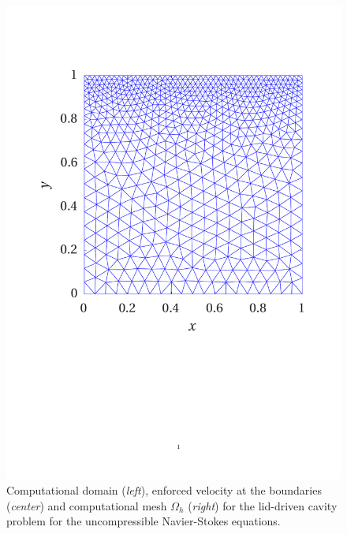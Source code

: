 \documentclass{elsarticle}
\numberwithin{equation}{section}
\theoremstyle{theorem}
\theoremstyle{definition}
\theoremstyle{remark}
\theoremstyle{proposition}
\numberwithin{figure}{section}
\begin{document}
\begin{figure}[t!]
\begin{minipage}{0.32\textwidth}
				\includegraphics[scale = 0.275, trim = {2cm 9cm 1.5cm 3.5cm}, clip]{dc_mesh}
			\end{minipage}
			
			\caption{Computational domain (\emph{left}), enforced velocity at the boundaries (\emph{center}) and computational mesh $\Omega_h$ (\emph{right}) for the lid-driven cavity problem for the uncompressible Navier-Stokes equations.}
			\label{fig:dc-domain}
			

\end{figure}
\end{document}
